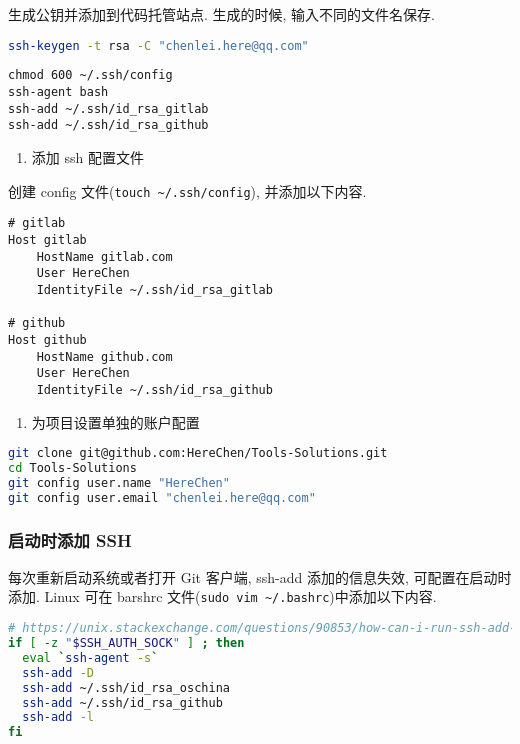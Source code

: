 生成公钥并添加到代码托管站点. 生成的时候, 输入不同的文件名保存.

\begin{lstlisting}[language=bash]
ssh-keygen -t rsa -C "chenlei.here@qq.com"
\end{lstlisting}

\begin{lstlisting}
chmod 600 ~/.ssh/config
ssh-agent bash
ssh-add ~/.ssh/id_rsa_gitlab
ssh-add ~/.ssh/id_rsa_github
\end{lstlisting}

\begin{enumerate}
\def\labelenumi{\arabic{enumi}.}
\setcounter{enumi}{1}
\tightlist
\item
  添加 ssh 配置文件
\end{enumerate}

创建 config 文件(\lstinline!touch ~/.ssh/config!), 并添加以下内容.

\begin{lstlisting}
# gitlab
Host gitlab
    HostName gitlab.com
    User HereChen
    IdentityFile ~/.ssh/id_rsa_gitlab

# github
Host github
    HostName github.com
    User HereChen
    IdentityFile ~/.ssh/id_rsa_github
\end{lstlisting}

\begin{enumerate}
\def\labelenumi{\arabic{enumi}.}
\setcounter{enumi}{2}
\tightlist
\item
  为项目设置单独的账户配置
\end{enumerate}

\begin{lstlisting}[language=bash]
git clone git@github.com:HereChen/Tools-Solutions.git
cd Tools-Solutions
git config user.name "HereChen"
git config user.email "chenlei.here@qq.com"
\end{lstlisting}

\subsubsection{启动时添加 SSH}\label{ux542fux52a8ux65f6ux6dfbux52a0-ssh}

每次重新启动系统或者打开 Git 客户端, ssh-add 添加的信息失效,
可配置在启动时添加. Linux 可在 barshrc
文件(\lstinline!sudo vim ~/.bashrc!)中添加以下内容.

\begin{lstlisting}[language=bash]
# https://unix.stackexchange.com/questions/90853/how-can-i-run-ssh-add-automatically-without-password-prompt
if [ -z "$SSH_AUTH_SOCK" ] ; then
  eval `ssh-agent -s`
  ssh-add -D
  ssh-add ~/.ssh/id_rsa_oschina
  ssh-add ~/.ssh/id_rsa_github
  ssh-add -l
fi
\end{lstlisting}

